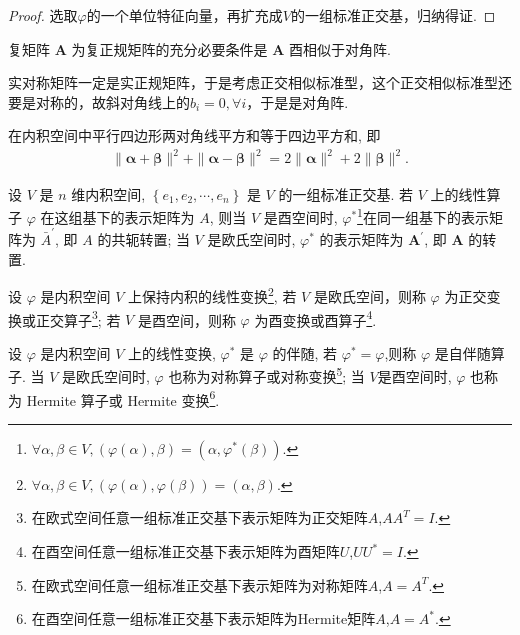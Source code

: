 \begin{proof}
    选取$\varphi$的一个单位特征向量，再扩充成$V$的一组标准正交基，归纳得证.
\end{proof}

\begin{theorem}\label{memeda10}
    复矩阵 $\boldsymbol{A}$ 为复正规矩阵的充分必要条件是 $\boldsymbol{A}$ 酉相似于对角阵.
\end{theorem}

\begin{note}
    实对称矩阵一定是实正规矩阵，于是考虑正交相似标准型，这个正交相似标准型还要是对称的，故斜对角线上的$b_i=0,\forall i$，于是是对角阵.
\end{note}

\begin{property}[factos]
    在内积空间中平行四边形两对角线平方和等于四边平方和, 即
    \begin{align*}
        \|\boldsymbol{\alpha}+\boldsymbol{\beta}\|^2+\|\boldsymbol{\alpha}-\boldsymbol{\beta}\|^2=2\|\boldsymbol{\alpha}\|^2+2\|\boldsymbol{\beta}\|^2 .
    \end{align*}
\end{property}

\begin{definition}[伴随$(\varphi(\alpha),\beta)=(\alpha,\varphi^*(\beta))$]
    设 $V$ 是 $n$ 维内积空间, $\left\{e_1, e_2, \cdots, e_n\right\}$ 是 $V$ 的一组标准正交基. 若 $V$ 上的线性算子 $\varphi$ 在这组基下的表示矩阵为 $A$, 则当 $V$ 是酉空间时, $\varphi^*$\footnote{$\forall \alpha,\beta\in V,(\varphi(\alpha),\beta)=(\alpha,\varphi^*(\beta)).$}在同一组基下的表示矩阵为 $\bar{A}^{\prime}$, 即 $A$ 的共轭转置; 当 $V$ 是欧氏空间时, $\varphi^*$ 的表示矩阵为 $\boldsymbol{A}^{\prime}$, 即 $\boldsymbol{A}$ 的转置.
\end{definition}

\begin{definition}[保持内积的线性变换$(\varphi(\alpha),\varphi (\beta))=(\alpha,\beta)$]
    设 $\varphi$ 是内积空间 $V$ 上保持内积的线性变换\footnote{$\forall \alpha,\beta\in V,(\varphi(\alpha),\varphi (\beta))=(\alpha,\beta).$}, 若 $V$ 是欧氏空间，则称 $\varphi$ 为正交变换或正交算子\footnote{在欧式空间任意一组标准正交基下表示矩阵为正交矩阵$A$,$AA^T=I$.}; 若 $V$ 是酉空间，则称 $\varphi$ 为酉变换或酉算子\footnote{在酉空间任意一组标准正交基下表示矩阵为酉矩阵$U$,$UU^*=I$.}.
\end{definition}

\begin{definition}[自伴随算子$\varphi^*=\varphi$]
    设 $\varphi$ 是内积空间 $V$ 上的线性变换, $\varphi^*$ 是 $\varphi$ 的伴随, 若 $\varphi^*=\varphi$,则称 $\varphi$ 是自伴随算子. 当 $V$ 是欧氏空间时, $\varphi$ 也称为对称算子或对称变换\footnote{在欧式空间任意一组标准正交基下表示矩阵为对称矩阵$A$,$A=A^T$.}; 当 $V$是酉空间时, $\varphi$ 也称为 Hermite 算子或 Hermite 变换\footnote{在酉空间任意一组标准正交基下表示矩阵为Hermite矩阵$A$,$A=A^*$.}.
\end{definition}


